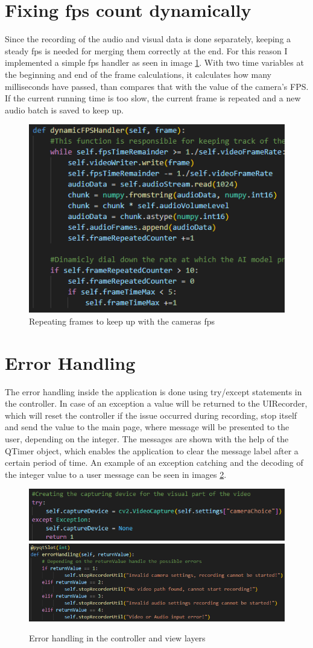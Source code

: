 \section{Fixing fps count dynamically}
\label{sec:designsec3}

\par Since the recording of the audio and visual data is done separately, keeping a steady fps is needed for merging them correctly at the end. For this reason I implemented a simple fps handler as seen in image \ref{fig:FpsHandler}. With two time variables at the beginning and end of the frame calculations, it calculates how many milliseconds have passed, than compares that with the value of the camera's FPS. If the current running time is too slow, the current frame is repeated and a new audio batch is saved to keep up.

\begin{figure}
    \centering
    \includegraphics[width=0.4\linewidth]{figures/FpsHandler.png}
    \caption{Repeating frames to keep up with the cameras fps}
    \label{fig:FpsHandler}
\end{figure}

\section{Error Handling}
\label{sec:designsec4}

\par The error handling inside the application is done using try/except statements in the controller. In case of an exception a value will be returned to the UIRecorder, which will reset the controller if the issue occurred during recording, stop itself and send the value to the main page, where message will be presented to the user, depending on the integer. The messages are shown with the help of the QTimer object, which enables the application to clear the message label after a certain period of time. An example of an exception catching and the decoding of the integer value to a user message can be seen in images \ref{fig:ErrorHandling}.

\begin{figure}
    \centering
    \includegraphics[width=0.4\linewidth]{figures/TryExcept.png}
    \includegraphics[width=0.4\linewidth]{figures/ErrorDecoding.png}
    \caption{Error handling in the controller and view layers}
    \label{fig:ErrorHandling}
\end{figure}

